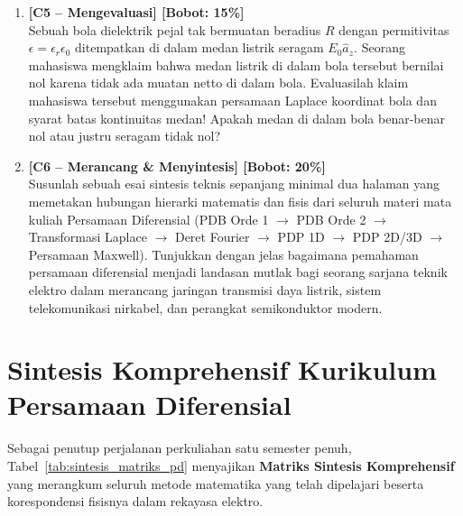 \documentclass[11pt,a4paper]{article}
\theoremstyle{definition}
\begin{document}
\begin{enumerate}[leftmargin=*, label=\textbf{\arabic*.}]
    \item \textbf{[C5 -- Mengevaluasi] [Bobot: 15\%]}\\
    Sebuah bola dielektrik pejal tak bermuatan beradius $R$ dengan permitivitas $\epsilon = \epsilon_r \epsilon_0$ ditempatkan di dalam medan listrik seragam $E_0 \hat{a}_z$. Seorang mahasiswa mengklaim bahwa medan listrik di dalam bola tersebut bernilai nol karena tidak ada muatan netto di dalam bola. Evaluasilah klaim mahasiswa tersebut menggunakan persamaan Laplace koordinat bola dan syarat batas kontinuitas medan! Apakah medan di dalam bola benar-benar nol atau justru seragam tidak nol?

    \item \textbf{[C6 -- Merancang \& Menyintesis] [Bobot: 20\%]}\\
    Susunlah sebuah esai sintesis teknis sepanjang minimal dua halaman yang memetakan hubungan hierarki matematis dan fisis dari seluruh materi mata kuliah Persamaan Diferensial (PDB Orde 1 $\to$ PDB Orde 2 $\to$ Transformasi Laplace $\to$ Deret Fourier $\to$ PDP 1D $\to$ PDP 2D/3D $\to$ Persamaan Maxwell). Tunjukkan dengan jelas bagaimana pemahaman persamaan diferensial menjadi landasan mutlak bagi seorang sarjana teknik elektro dalam merancang jaringan transmisi daya listrik, sistem telekomunikasi nirkabel, dan perangkat semikonduktor modern.
\end{enumerate}

\section{Sintesis Komprehensif Kurikulum Persamaan Diferensial}

Sebagai penutup perjalanan perkuliahan satu semester penuh, Tabel~\ref{tab:sintesis_matriks_pd} menyajikan \textbf{Matriks Sintesis Komprehensif} yang merangkum seluruh metode matematika yang telah dipelajari beserta korespondensi fisisnya dalam rekayasa elektro.
\end{document}
